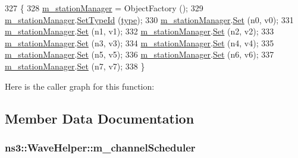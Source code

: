 \begin{DoxyCode}
327 \{
328   \hyperlink{classns3_1_1WaveHelper_ad6f8c0136ece039608e1e8030e4cef14}{m\_stationManager} = ObjectFactory ();
329   \hyperlink{classns3_1_1WaveHelper_ad6f8c0136ece039608e1e8030e4cef14}{m\_stationManager}.\hyperlink{classns3_1_1ObjectFactory_a77dcd099064038a1eb7a6b8251229ec3}{SetTypeId} (\hyperlink{visualizer-ideas_8txt_add98db9e15e2a58cf2b57623e7aa893a}{type});
330   \hyperlink{classns3_1_1WaveHelper_ad6f8c0136ece039608e1e8030e4cef14}{m\_stationManager}.\hyperlink{classns3_1_1ObjectFactory_aef5c0d5019c96bdf01cefd1ff83f4a68}{Set} (n0, v0);
331   \hyperlink{classns3_1_1WaveHelper_ad6f8c0136ece039608e1e8030e4cef14}{m\_stationManager}.\hyperlink{classns3_1_1ObjectFactory_aef5c0d5019c96bdf01cefd1ff83f4a68}{Set} (n1, v1);
332   \hyperlink{classns3_1_1WaveHelper_ad6f8c0136ece039608e1e8030e4cef14}{m\_stationManager}.\hyperlink{classns3_1_1ObjectFactory_aef5c0d5019c96bdf01cefd1ff83f4a68}{Set} (n2, v2);
333   \hyperlink{classns3_1_1WaveHelper_ad6f8c0136ece039608e1e8030e4cef14}{m\_stationManager}.\hyperlink{classns3_1_1ObjectFactory_aef5c0d5019c96bdf01cefd1ff83f4a68}{Set} (n3, v3);
334   \hyperlink{classns3_1_1WaveHelper_ad6f8c0136ece039608e1e8030e4cef14}{m\_stationManager}.\hyperlink{classns3_1_1ObjectFactory_aef5c0d5019c96bdf01cefd1ff83f4a68}{Set} (n4, v4);
335   \hyperlink{classns3_1_1WaveHelper_ad6f8c0136ece039608e1e8030e4cef14}{m\_stationManager}.\hyperlink{classns3_1_1ObjectFactory_aef5c0d5019c96bdf01cefd1ff83f4a68}{Set} (n5, v5);
336   \hyperlink{classns3_1_1WaveHelper_ad6f8c0136ece039608e1e8030e4cef14}{m\_stationManager}.\hyperlink{classns3_1_1ObjectFactory_aef5c0d5019c96bdf01cefd1ff83f4a68}{Set} (n6, v6);
337   \hyperlink{classns3_1_1WaveHelper_ad6f8c0136ece039608e1e8030e4cef14}{m\_stationManager}.\hyperlink{classns3_1_1ObjectFactory_aef5c0d5019c96bdf01cefd1ff83f4a68}{Set} (n7, v7);
338 \}
\end{DoxyCode}


Here is the caller graph for this function\+:




\subsection{Member Data Documentation}
\subsubsection[{\texorpdfstring{m\+\_\+channel\+Scheduler}{m_channelScheduler}}]{ ns3\+::\+Wave\+Helper\+::m\+\_\+channel\+Scheduler\hspace{0.3cm}{\ttfamily [protected]}}\hypertarget{classns3_1_1WaveHelper_ac4708368922b43b2f61a8cdadd9e3b5b}{}\label{classns3_1_1WaveHelper_ac4708368922b43b2f61a8cdadd9e3b5b}


